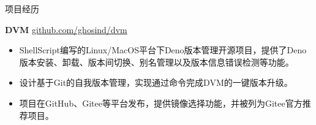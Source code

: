\documentclass{resume} %
\begin{document}
\begin{rSection}{项目经历}
  \item \textbf{DVM} {} \hfill \href{https://github.com/ghosind/dvm}{github.com/ghosind/dvm}
  \begin{itemize}
    \itemsep -3pt {}
    \item ShellScript编写的Linux/MacOS平台下Deno版本管理开源项目，提供了Deno版本安装、卸载、版本间切换、别名管理以及版本信息错误检测等功能。
    \item 设计基于Git的自我版本管理，实现通过命令完成DVM的一键版本升级。
    \item 项目在GitHub、Gitee等平台发布，提供镜像选择功能，并被列为Gitee官方推荐项目。
  \end{itemize}

\end{rSection}
\end{document}
